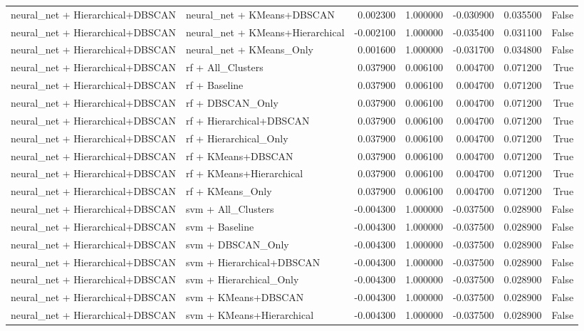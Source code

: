 \begin{tabular}{llrrrrr}
neural_net + Hierarchical+DBSCAN & neural_net + KMeans+DBSCAN & 0.002300 & 1.000000 & -0.030900 & 0.035500 & False \\
neural_net + Hierarchical+DBSCAN & neural_net + KMeans+Hierarchical & -0.002100 & 1.000000 & -0.035400 & 0.031100 & False \\
neural_net + Hierarchical+DBSCAN & neural_net + KMeans_Only & 0.001600 & 1.000000 & -0.031700 & 0.034800 & False \\
neural_net + Hierarchical+DBSCAN & rf + All_Clusters & 0.037900 & 0.006100 & 0.004700 & 0.071200 & True \\
neural_net + Hierarchical+DBSCAN & rf + Baseline & 0.037900 & 0.006100 & 0.004700 & 0.071200 & True \\
neural_net + Hierarchical+DBSCAN & rf + DBSCAN_Only & 0.037900 & 0.006100 & 0.004700 & 0.071200 & True \\
neural_net + Hierarchical+DBSCAN & rf + Hierarchical+DBSCAN & 0.037900 & 0.006100 & 0.004700 & 0.071200 & True \\
neural_net + Hierarchical+DBSCAN & rf + Hierarchical_Only & 0.037900 & 0.006100 & 0.004700 & 0.071200 & True \\
neural_net + Hierarchical+DBSCAN & rf + KMeans+DBSCAN & 0.037900 & 0.006100 & 0.004700 & 0.071200 & True \\
neural_net + Hierarchical+DBSCAN & rf + KMeans+Hierarchical & 0.037900 & 0.006100 & 0.004700 & 0.071200 & True \\
neural_net + Hierarchical+DBSCAN & rf + KMeans_Only & 0.037900 & 0.006100 & 0.004700 & 0.071200 & True \\
neural_net + Hierarchical+DBSCAN & svm + All_Clusters & -0.004300 & 1.000000 & -0.037500 & 0.028900 & False \\
neural_net + Hierarchical+DBSCAN & svm + Baseline & -0.004300 & 1.000000 & -0.037500 & 0.028900 & False \\
neural_net + Hierarchical+DBSCAN & svm + DBSCAN_Only & -0.004300 & 1.000000 & -0.037500 & 0.028900 & False \\
neural_net + Hierarchical+DBSCAN & svm + Hierarchical+DBSCAN & -0.004300 & 1.000000 & -0.037500 & 0.028900 & False \\
neural_net + Hierarchical+DBSCAN & svm + Hierarchical_Only & -0.004300 & 1.000000 & -0.037500 & 0.028900 & False \\
neural_net + Hierarchical+DBSCAN & svm + KMeans+DBSCAN & -0.004300 & 1.000000 & -0.037500 & 0.028900 & False \\
neural_net + Hierarchical+DBSCAN & svm + KMeans+Hierarchical & -0.004300 & 1.000000 & -0.037500 & 0.028900 & False \\

\end{tabular}
